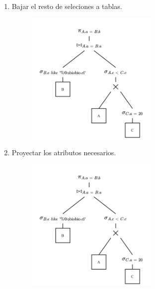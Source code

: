 \documentclass{templateNote}
\begin{document}
\begin{enumerate}
\begin{itemize}
\begin{enumerate}
            \newpage
            \item Bajar el resto de seleciones a tablas.
            \begin{figure}[H]
                \centering
                \includegraphics[width=0.6\textwidth]{img/E3-Paso-5.png}
            \end{figure}

            \item Proyectar los atributos necesarios.
            \begin{figure}[H]
                \centering
                \includegraphics[width=0.6\textwidth]{img/E3-Paso-6.png}
            \end{figure}
        \end{enumerate}
    \end{itemize}


\end{enumerate}
\end{document}
